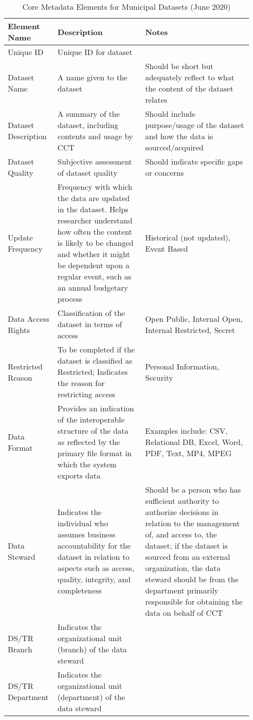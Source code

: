 \begin{table}

\caption{\label{tab:cctapptabdata}Core Metadata Elements for Municipal Datasets (June 2020)}
\centering
\begin{tabulary}{1.0\textwidth}{lLL}
\toprule
Element Name & Description & Notes\\
\midrule
Unique ID & Unique ID for dataset & \\
Dataset Name & A name given to the dataset & Should be short but adequately reflect to what the content of the dataset relates\\
Dataset Description & A summary of the dataset, including contents and usage by CCT & Should include purpose/usage of the dataset and how the data is sourced/acquired\\
Dataset Quality & Subjective assessment of dataset quality & Should indicate specific gaps or concerns\\
Update Frequency & Frequency with which the data are updated in the dataset. Helps researcher understand how often the content is likely to be changed and whether it might be dependent upon a regular event, such as an annual budgetary process & Historical (not updated), Event Based\\
\addlinespace
Data Access Rights & Classification of the dataset in terms of access & Open Public, Internal Open, Internal Restricted, Secret\\
Restricted Reason & To be completed if the dataset is classified as Restricted; Indicates the reason for restricting access & Personal Information, Security\\
Data Format & Provides an indication of the interoperable structure of the data as reflected by the primary file format in which the system exports data & Examples include: CSV, Relational DB, Excel, Word, PDF, Text, MP4, MPEG\\
Data Steward & Indicates the individual who assumes business accountability for the dataset in relation to aspects such as access, quality, integrity, and completeness & Should be a person who has sufficient authority to authorize decisions in relation to the management of, and access to, the dataset; if the dataset is sourced from an external organization, the data steward should be from the department primarily responsible for obtaining the data on behalf of CCT\\
DS/TR Branch & Indicates the organizational unit (branch) of the data steward & \\
\addlinespace
DS/TR Department & Indicates the organizational unit (department) of the data steward & \\

\end{tabulary}
\end{table}
